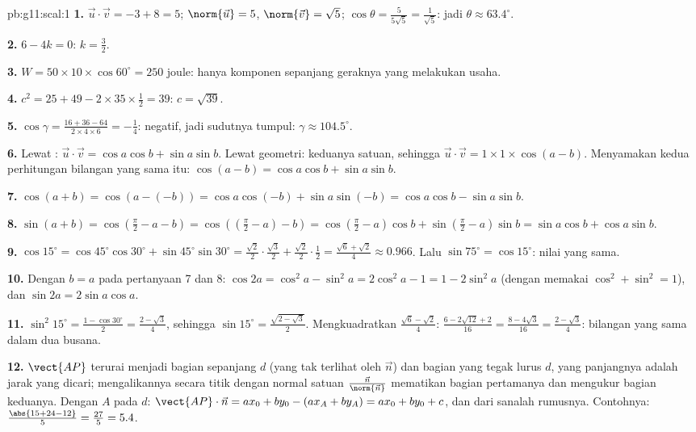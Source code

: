 \begin{solution}{pb:g11:scal:1}
\textbf{1.} $\vec u \cdot \vec v = -3 + 8 = 5$;
$\norm{\vec u} = 5$, $\norm{\vec v} = \sqrt5$;
$\cos\theta = \frac{5}{5\sqrt5} = \frac{1}{\sqrt5}$:
jadi $\theta \approx 63.4^\circ$.

\textbf{2.} $6 - 4k = 0$: $k = \frac32$.

\textbf{3.} $W = 50 \times 10 \times \cos 60^\circ = 250$
joule: hanya komponen sepanjang geraknya yang melakukan usaha.

\textbf{4.} $c^2 = 25 + 49 - 2 \times 35 \times \frac12 = 39$:
$c = \sqrt{39}$.

\textbf{5.} $\cos\gamma = \frac{16 + 36 - 64}{2 \times 4
\times 6} = -\frac14$: negatif, jadi sudutnya tumpul:
$\gamma \approx 104.5^\circ$.

\textbf{6.} Lewat : $\vec u \cdot \vec v = \cos a \cos b +
\sin a \sin b$. Lewat geometri: keduanya  satuan, sehingga
$\vec u \cdot \vec v = 1 \times 1 \times \cos(a - b)$.
Menyamakan kedua perhitungan bilangan yang sama itu:
$\cos(a - b) = \cos a \cos b + \sin a \sin b$.

\textbf{7.} $\cos(a + b) = \cos(a - (-b)) = \cos a \cos(-b) +
\sin a \sin(-b) = \cos a \cos b - \sin a \sin b$.

\textbf{8.} $\sin(a + b) = \cos\left(\frac\pi2 - a - b\right)
= \cos\left(\left(\frac\pi2 - a\right) - b\right)
= \cos\left(\frac\pi2 - a\right)\cos b +
\sin\left(\frac\pi2 - a\right)\sin b
= \sin a \cos b + \cos a \sin b$.

\textbf{9.} $\cos 15^\circ = \cos 45^\circ \cos 30^\circ +
\sin 45^\circ \sin 30^\circ = \frac{\sqrt2}{2} \cdot
\frac{\sqrt3}{2} + \frac{\sqrt2}{2} \cdot \frac12 =
\frac{\sqrt6 + \sqrt2}{4} \approx 0.966$. Lalu
$\sin 75^\circ = \cos 15^\circ$: nilai yang sama.

\textbf{10.} Dengan $b = a$ pada pertanyaan 7 dan 8:
$\cos 2a = \cos^2 a - \sin^2 a = 2\cos^2 a - 1 = 1 - 2\sin^2 a$
(dengan memakai $\cos^2 + \sin^2 = 1$), dan
$\sin 2a = 2 \sin a \cos a$.

\textbf{11.} $\sin^2 15^\circ = \frac{1 - \cos 30^\circ}{2}
= \frac{2 - \sqrt3}{4}$, sehingga
$\sin 15^\circ = \frac{\sqrt{2 - \sqrt3}}{2}$. Mengkuadratkan
$\frac{\sqrt6 - \sqrt2}{4}$:
$\frac{6 - 2\sqrt{12} + 2}{16} = \frac{8 - 4\sqrt3}{16} =
\frac{2 - \sqrt3}{4}$: bilangan yang sama dalam dua busana.

\textbf{12.} $\vect{AP}$ terurai menjadi bagian sepanjang $d$
(yang tak terlihat oleh $\vec n$) dan bagian yang tegak lurus $d$, yang
panjangnya adalah jarak yang dicari; mengalikannya secara titik dengan normal
satuan $\frac{\vec n}{\norm{\vec n}}$ mematikan bagian pertamanya dan
mengukur bagian keduanya. Dengan $A$ pada $d$:
$\vect{AP} \cdot \vec n = a x_0 + b y_0 - (a x_A + b y_A) =
a x_0 + b y_0 + c$, dan dari sanalah rumusnya. Contohnya:
$\frac{\abs{15 + 24 - 12}}{5} = \frac{27}{5} = 5.4$.


\end{solution}
